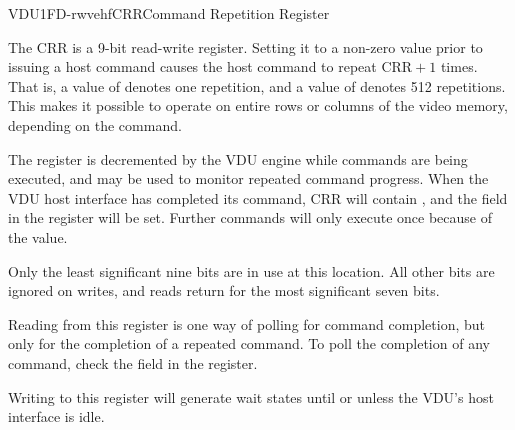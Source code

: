 \begin{ioport}{VDU}{1FD}{-rwvehf}{CRR}{Command Repetition Register}

  The CRR is a 9-bit read-write register. Setting it to a non-zero value prior
  to issuing a host command causes the host command to repeat $\mbox{CRR}+1$
  times. That is, a value of  denotes one repetition, and a value of
   denotes 512 repetitions. This makes it possible to operate on
  entire rows or columns of the video memory, depending on the command.

  The register is decremented by the VDU engine while commands are being
  executed, and may be used to monitor repeated command progress. When the VDU
  host interface has completed its command, CRR will contain , and the
   field in the  register will be set. Further commands
  will only execute once because of the  value.

  \begin{bitfield}
  \end{bitfield}

  Only the least significant nine bits are in use at this location. All other
  bits are ignored on writes, and reads return  for the most
  significant seven bits.

  Reading from this register is one way of polling for command completion, but
  only for the completion of a repeated command. To poll the completion of any
  command, check the  field in the  register.

  Writing to this register will generate wait states until or unless the VDU's
  host interface is idle.

\end{ioport}



